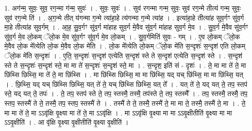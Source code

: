 \documentclass[17pt]{extarticle}
\begin{document}
1. अग॑न्म॒ सुवः॒ सुव॒ रग॒न्मा ग॑न्म॒ सुवः॑ । . सुवः॒ सुवः॑ । . सुव॑ रगन्मा गन्म॒ सुवः॒ सुव॑ रग॒न्मे तीत्य॑ गन्म॒ सुवः॒ सुव॑ रग॒न्मे ति॑ । . अ॒ग॒न्मे तीत् य॑गन्मा ग॒न्मे त्या॑हा॒हे त्य॑गन्मा ग॒न्मे त्या॑ह । . इत्या॑हा॒हे तीत्या॑ह सुव॒र्गꣳ सु॑व॒र्ग मा॒हे तीत्या॑ह सुव॒र्गम् । . आ॒ह॒ सु॒व॒र्गꣳ सु॑व॒र्ग मा॑हाह सुव॒र्ग मे॒वैव सु॑व॒र्ग मा॑हाह सुव॒र्ग मे॒व । . सु॒व॒र्ग मे॒वैव सु॑व॒र्गꣳ सु॑व॒र्ग मे॒व लो॒कम् ॅलो॒क मे॒व सु॑व॒र्गꣳ सु॑व॒र्ग मे॒व लो॒कम् । . सु॒व॒र्गमिति॑ सुवः - गम् । . ए॒व लो॒कम् ॅलो॒क मे॒वैव लो॒क मे᳚त्येति लो॒क मे॒वैव लो॒क मे॑ति । . लो॒क मे᳚त्येति लो॒कम् ॅलो॒क मे॑ति स॒न्दृशः॑ स॒न्दृश॑ एति लो॒कम् ॅलो॒क मे॑ति स॒न्दृशः॑ । . ए॒ति॒ स॒न्दृशः॑ स॒न्दृश॑ एत्येति स॒न्दृश॑ स्ते ते स॒न्दृश॑ एत्येति स॒न्दृश॑ स्ते । . स॒न्दृश॑ स्ते ते स॒न्दृशः॑ स॒न्दृश॑ स्ते॒ मा मा ते॑ स॒न्दृशः॑ स॒न्दृश॑ स्ते॒ मा । . स॒न्दृश॒ इति॑ सं - दृशः॑ । . ते॒ मा मा ते॑ ते॒ मा छि॑थ्सि छिथ्सि॒ मा ते॑ ते॒ मा छि॑थ्सि । . मा छि॑थ्सि छिथ्सि॒ मा मा छि॑थ्सि॒ यद् यच् छि॑थ्सि॒ मा मा छि॑थ्सि॒ यत् । . छि॒थ्सि॒ यद् यच् छि॑थ्सि छिथ्सि॒ यत् ते॑ ते॒ यच् छि॑थ्सि छिथ्सि॒ यत् ते᳚ । . यत् ते॑ ते॒ यद् यत् ते॒ तप॒ स्तप॑ स्ते॒ यद् यत् ते॒ तपः॑ । . ते॒ तप॒ स्तप॑ स्ते ते॒ तप॒ स्तस्मै॒ तस्मै॒ तप॑स्ते ते॒ तप॒ स्तस्मै᳚ । . तप॒ स्तस्मै॒ तस्मै॒ तप॒ स्तप॒ स्तस्मै॑ ते ते॒ तस्मै॒ तप॒ स्तप॒ स्तस्मै॑ ते । . तस्मै॑ ते ते॒ तस्मै॒ तस्मै॑ ते॒ मा मा ते॒ तस्मै॒ तस्मै॑ ते॒ मा । . ते॒ मा मा ते॑ ते॒ मा ऽऽवृ॑क्षि वृ॒क्ष्या मा ते॑ ते॒ मा ऽऽवृ॑क्षि । . मा ऽऽवृ॑क्षि वृ॒क्ष्या मा मा ऽऽवृ॒क्षीतीति॑ वृ॒क्ष्या मा मा ऽऽवृ॒क्षीति॑ । . आ वृ॑क्षि वृ॒क्ष्या वृ॒क्षीतीति॑ वृ॒क्ष्या वृ॒क्षीति॑ । \newline
\end{document}
